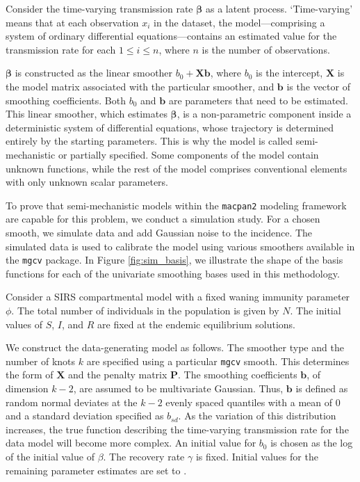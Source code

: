 \documentclass[
11pt, %
oneside, %
english, %
singlespacing, %
]{macthesis} %
\begin{document}
Consider the time-varying transmission rate \(\boldsymbol{\beta}\) as a latent process. `Time-varying' means that at each observation \(x_i\) in the dataset, the model---comprising a system of ordinary differential equations---contains an estimated value for the transmission rate for each \(1 \leq i \leq n\), where \(n\) is the number of observations.

\(\boldsymbol{\beta}\) is constructed as the linear smoother \(b_0 + \mathbf{X}\mathbf{b}\), where \(b_0\) is the intercept, \(\mathbf{X}\) is the model matrix associated with the particular smoother, and \(\mathbf{b}\) is the vector of smoothing coefficients. Both \(b_0\) and \(\mathbf{b}\) are parameters that need to be estimated. This linear smoother, which estimates \(\boldsymbol{\beta}\), is a non-parametric component inside a deterministic system of differential equations, whose trajectory is determined entirely by the starting parameters. This is why the model is called semi-mechanistic or partially specified. Some components of the model contain unknown functions, while the rest of the model comprises conventional elements with only unknown scalar parameters.

To prove that semi-mechanistic models within the \texttt{macpan2} modeling framework are capable for this problem, we conduct a simulation study. For a chosen smooth, we simulate data and add Gaussian noise to the incidence. The simulated data is used to calibrate the model using various smoothers available in the \texttt{mgcv} package. In Figure \ref{fig:sim_basis}, we illustrate the shape of the basis functions for each of the univariate smoothing bases used in this methodology.

Consider a SIRS compartmental model with a fixed waning immunity parameter \(\phi\). The total number of individuals in the population is given by \(N\). The initial values of \(S\), \(I\), and \(R\) are fixed at the endemic equilibrium solutions.

We construct the data-generating model as follows. The smoother type and the number of knots \(k\) are specified using a particular \texttt{mgcv} smooth. This determines the form of \(\mathbf{X}\) and the penalty matrix \(\mathbf{P}\). The smoothing coefficients \(\mathbf{b}\), of dimension \(k-2\), are assumed to be multivariate Gaussian. Thus, \(\mathbf{b}\) is defined as random normal deviates at the \(k-2\) evenly spaced quantiles with a mean of 0 and a standard deviation specified as \(b_{sd}\). As the variation of this distribution increases, the true function describing the time-varying transmission rate for the data model will become more complex. An initial value for \(b_0\) is chosen as the log of the initial value of \(\beta\). The recovery rate \(\gamma\) is fixed. Initial values for the remaining parameter estimates are set to .
\end{document}
